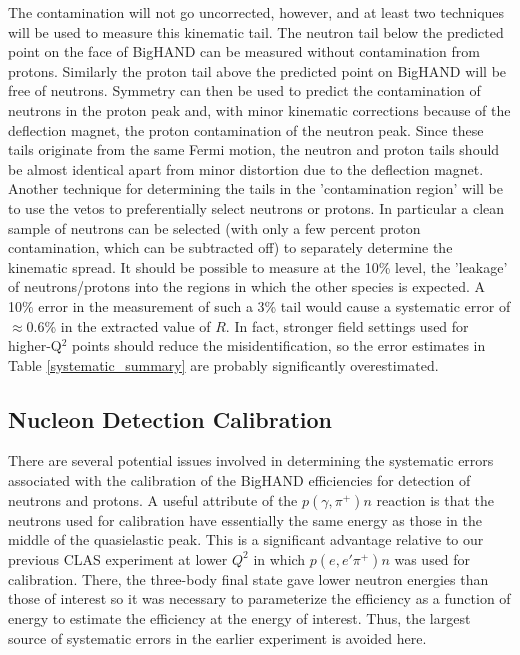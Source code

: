 \documentclass[12pt,letterpaper,oneside]{article}
\begin{document}
The contamination will not go uncorrected, however, and at least two
techniques will be used to measure this kinematic tail.  The neutron
tail below the predicted point on the face of BigHAND 
can be measured without contamination
from protons. Similarly the proton tail above the predicted point on
BigHAND will
be free of neutrons.  Symmetry can then be used to predict the
contamination of neutrons in the proton peak and, with minor kinematic
corrections because of the deflection magnet, the proton contamination
of the neutron peak.  
Since these tails originate from the same Fermi motion, the neutron and
proton tails should be almost identical apart from minor distortion
due to the deflection magnet.  Another technique for determining the
tails in the 'contamination region' will be to use the vetos to
preferentially select neutrons or protons.  In particular a clean
sample of neutrons can be selected (with only a few percent proton
contamination, which can be subtracted off) to separately determine 
the kinematic spread.  It should be possible to measure at the 10\%
level, the 'leakage' of neutrons/protons into the regions in which the
other species is expected.   A 10\% error in the measurement of such a
3\% tail would cause a systematic error of $\approx$0.6\% in the extracted
value of $R$.  In fact, stronger field settings used for higher-Q$^2$
points should reduce the misidentification, so the error estimates in 
Table \ref{systematic_summary} are probably significantly overestimated.


\subsection{Nucleon Detection Calibration}

There are several potential issues involved in determining the systematic errors
associated with the calibration of the BigHAND efficiencies for
detection of neutrons and protons.  A useful attribute of the 
$p(\gamma,\pi^+)n$ reaction is that the neutrons used for calibration
have essentially the same energy as those in the middle of the
quasielastic peak.  This is a significant advantage relative to our
previous CLAS experiment \cite{Will,Jeff} at lower $Q^2$ in which $p(e,e'\pi^+)n$ was used for 
calibration.  There, the three-body final state gave lower neutron
energies than those of interest so it was necessary to parameterize
the efficiency as a function of energy to estimate the efficiency at
the energy of interest.  Thus, the largest source of systematic
errors in the earlier experiment is avoided here.
\end{document}

